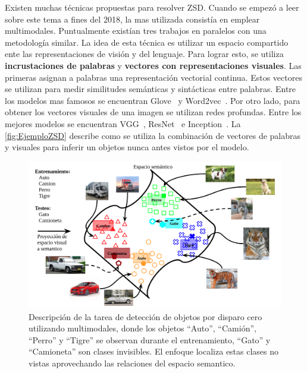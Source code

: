 Existen muchas técnicas propuestas para resolver ZSD. Cuando se empezó a leer sobre este tema a fines del 2018, la mas utilizada consistía en emplear multimodales. Puntualmente existían tres trabajos en paralelos \cite{rahman2018zero}\cite{zhu2018zero}\cite{bansal2018zero} con una metodología similar. La idea de esta técnica es utilizar un espacio compartido ente las representaciones de visión y del lenguaje. Para lograr esto, se utiliza  \textbf{incrustaciones de palabras} y \textbf{vectores con representaciones visuales}. Las primeras asignan a palabras una representación vectorial continua. Estos vectores se utilizan para medir similitudes semánticas y sintácticas entre palabras. Entre los modelos mas famosos se encuentran Glove~\cite{pennington-etal-2014-glove} y Word2vec~\cite{mikolov2013efficient}. Por otro lado, para obtener los vectores visuales de una imagen se utilizan redes profundas. Entre los mejores modelos se encuentran VGG~\cite{simonyan2014very}, ResNet~\cite{resnet} e Inception~\cite{Szegedy_2015_CVPR}. La \autoref{fig:EjemploZSD} describe como se utiliza la combinación de vectores de palabras y visuales para inferir un objetos nunca antes vistos por el modelo.\\

\begin{figure}[]
	\centering
	\includegraphics[width=1\textwidth]{img/Modelo.png}
	\caption{Descripción de la tarea de detección de objetos por disparo cero utilizando multimodales, donde los objetos ``Auto'', ``Camión'', ``Perro'' y ``Tigre'' se observan  durante el entrenamiento,  ``Gato'' y ``Camioneta'' son clases invisibles. El enfoque localiza estas clases no vistas aprovechando las relaciones del espacio semantico.}
	\label{fig:EjemploZSD}
\end{figure}

